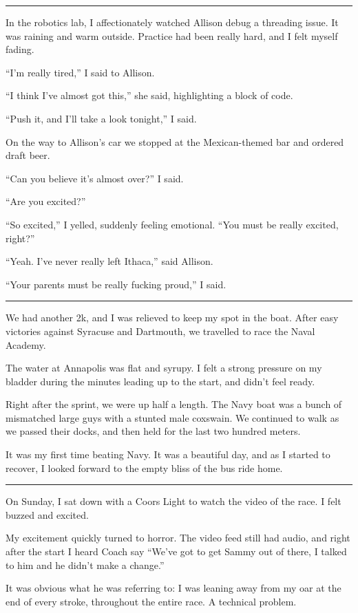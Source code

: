 \plainfancybreak{12pt}{2}{}

In the robotics lab, I affectionately watched Allison debug a threading issue.
It was raining and warm outside.  Practice had been really hard, and I felt
myself fading.

``I'm really tired,'' I said to Allison.

``I think I've almost got this,'' she said, highlighting a block of code.

``Push it, and I'll take a look tonight,'' I said.

On the way to Allison's car we stopped at the Mexican-themed bar and ordered
draft beer.

``Can you believe it's almost over?'' I said.

``Are you excited?''

``So excited,'' I yelled, suddenly feeling emotional.  ``You must be
really excited, right?''

``Yeah.  I've never really left Ithaca,'' said Allison.

``Your parents must be really fucking proud,'' I said.

\plainfancybreak{12pt}{2}{}

We had another 2k, and I was relieved to keep my spot in the boat.  After easy
victories against Syracuse and Dartmouth, we travelled to race the Naval
Academy.

The water at Annapolis was flat and syrupy.  I felt a strong pressure on my
bladder during the minutes leading up to the start, and didn't feel ready.

Right after the sprint, we were up half a length.  The Navy boat was a bunch of
mismatched large guys with a stunted male coxswain.  We continued to walk as we
passed their docks, and then held for the last two hundred meters.

It was my first time beating Navy.  It was a beautiful day, and as I started to
recover, I looked forward to the empty bliss of the bus ride home.

\plainfancybreak{12pt}{2}{}

On Sunday, I sat down with a Coors Light to watch the video of the race.  I felt
buzzed and excited.

My excitement quickly turned to horror.  The video feed still had audio, and
right after the start I heard Coach say ``We've got to get Sammy out of there,
I talked to him and he didn't make a change.''

It was obvious what he was referring to: I was leaning away from my oar at the
end of every stroke, throughout the entire race.  A technical problem.

